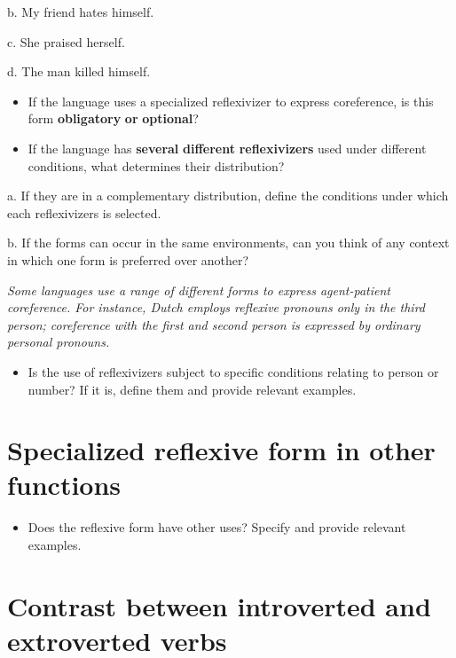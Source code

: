 \documentclass[output=paper]{langsci/langscibook} \label{AppendixA}
\begin{document}
b.  My friend hates himself. 



c.  She praised herself. 



d.  The man killed himself. 


\begin{itemize}
\item
If the language uses a specialized reflexivizer to express coreference, is this form \textbf{obligatory} \textbf{or} \textbf{optional}? 

\item
If the language has \textbf{several} \textbf{different} \textbf{reflexivizers} used under different conditions, what determines their distribution? 

\end{itemize}

a.  If they are in a complementary distribution, define the conditions under which each reflexivizers is selected. 



b.  If the forms can occur in the same environments, can you think of any context in which one form is preferred over another? 


\textit{Some languages use a range of different forms to express agent-patient coreference. For instance, Dutch employs reflexive pronouns only in the third person; coreference with the first and second person is expressed by ordinary personal pronouns.}

\begin{itemize}
\item
Is the use of reflexivizers subject to specific conditions relating to person or number? If it is, define them and provide relevant examples. 

\end{itemize}
\section{Specialized reflexive form in other functions} 
\begin{itemize}
\item
Does the reflexive form have other uses? Specify and provide relevant examples. 

\end{itemize}
\section{Contrast between introverted and extroverted verbs} 
\end{document}
